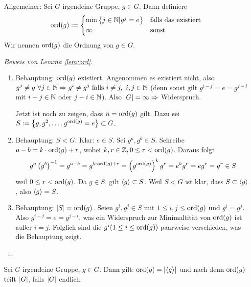 \documentclass[12pt,a4paper]{scrartcl}
\begin{document}
\begin{defi}
	Allgemeiner: Sei $G$ irgendeine Gruppe, $g \in G$. Dann definiere \begin{equation*}
		\ord(g) := \begin{cases*}
		\min \left\lbrace j \in \IN | g^j = e\right\rbrace &falls das existiert \\
		\infty &sonst
		\end{cases*}
	\end{equation*}
	Wir nennen $\operatorname{ord}(g)$ die Ordnung von $g \in G$.
\end{defi}

\begin{proof} [Beweis von Lemma \ref{lem:ord}]
	\begin{enumerate}
	\item Behauptung: $\operatorname{ord}(g)$ existiert. Angenommen es existiert nicht, also 
	$
		g^j \not = g ~ \forall j \in \mathbb N \Rightarrow g^i \neq g^j \text{ falls } i \neq j, ~ i,j \in \mathbb N 
	$
	(denn sonst gilt $g^{i-j}=e=g^{j-i}$ mit $i-j \in \mathbb N$ oder $j-i \in \mathbb N$).
	Also $\lvert G\rvert = \infty \Rightarrow$ Widerspruch.
	
	Jetzt ist noch zu zeigen, dass $n = \operatorname{ord}(g)$ gilt. Dazu sei $S := \left\lbrace g, g^2, \ldots, g^{\operatorname{ord}(g)} = e \right\rbrace \subset G$.
	
	\item Behauptung: $S < G$. Klar: $e \in S$. Sei $g^a, g^b \in S$. Schreibe $a-b = k \cdot \operatorname{ord}(g) + r$, wobei $k, r \in \mathbb Z, 0 \leq r < \operatorname{ord}(g)$. Daraus folgt
	\begin{equation*}
		g^a\left( g^b \right)^{-1}=g^{a-b}=g^{k \cdot \operatorname{ord}(g)+r}
		= \left(g^{\operatorname{ord}(g)} \right)^kg^r = e^kg^r=eg^r=g^r \in S
	\end{equation*}
	weil $0 \leq r < \operatorname{ord}(g)$.
	Da $g \in S$, gilt $\langle g\rangle\subset S$. Weil $S < G$ ist klar, dass $S \subset \langle g\rangle$, also $\langle g\rangle = S$.
	\item Behauptung: $\lvert S\rvert = \operatorname{ord}(g)$. Seien $g^i, g^j \in S$ mit $1 \leq i,j \leq \operatorname{ord}(g)$ und $g^i=g^j$. Also $g^{i-j} = e = g^{j-i}$, was ein Widerspruch zur Minimaltität von $\operatorname{ord}(g)$ ist außer $i=j$. Folglich sind die $g^i (1\leq i \leq \operatorname{ord}(g))$ paarweise verschieden, was die Behauptung zeigt.
	\end{enumerate}
\end{proof}

\begin{bem}
	Sei $G$ irgendeine Gruppe, $g\in G$. Dann gilt: $\operatorname{ord}(g) = \lvert\langle g\rangle\rvert$ und nach  denn $\operatorname{ord}(g)$ teilt $\lvert G\rvert$, falls $\lvert G\rvert$ endlich.
\end{bem}
\end{document}
